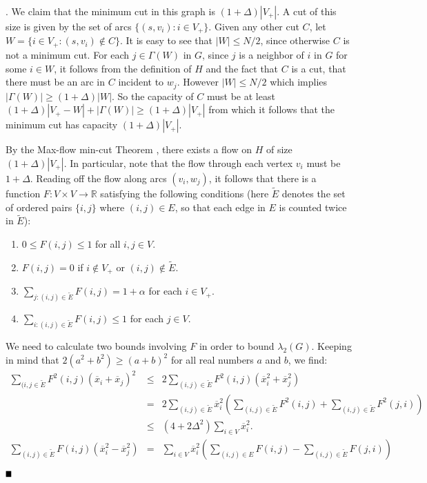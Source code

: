 \documentclass{article}
\newcommand{\bproof}{\noindent{\bf Proof}}
\newcommand{\eproof}{\hspace*{\fill}$\rule{2mm}{2mm}$~~~~\bigskip}
\renewenvironment{proof}{\bproof. }{\eproof}
\newcommand{\R}{\mathbb{R}}
\begin{document}
\begin{proof}
We claim that the minimum cut in this graph is $(1+\Delta )|V_+|$. A cut of this size is given by the set of arcs $\{ (s,v_i):i\in V_+\}$. Given any other cut $C$, let $W=\{ i\in V_+:(s,v_i)\not\in C\}$. It is easy to see that $|W|\leq N/2$, since otherwise $C$ is not a minimum cut. For each $j\in \Gamma (W)$ in $G$, since $j$ is a neighbor of $i$ in $G$ for some $i\in W$, it follows from the definition of $H$ and the fact that $C$ is a cut, that there must be an arc in $C$ incident to $w_j$. However $|W|\leq N/2$ which implies $|\Gamma (W)|\geq (1+\Delta )|W|$. So the capacity of $C$ must be at least $(1+\Delta )|V_+-W|+|\Gamma (W)|\geq (1+\Delta )|V_+|$ from which it follows that the minimum cut has capacity $(1+\Delta )|V_+|$.

By the Max-flow min-cut Theorem \cite[Section 24.2, Theorem 24.6]{CLR2022}, there exists a flow on $H$ of size $(1+\Delta )|V_+|$. In particular, note that the flow through each vertex $v_i$ must be $1+\Delta$. Reading off the flow along arcs $(v_i,w_j)$, it follows that there is a function $F:V\times V\rightarrow \R$ satisfying the following conditions (here $\tilde{E}$ denotes the set of ordered pairs $\{ i,j\}$ where $(i,j)\in E$, so that each edge in $E$ is counted twice in $\tilde{E}$):
\begin{enumerate}
\item $0\leq F(i,j)\leq 1$ for all $i,j\in V$.
\item $F(i,j)=0$ if $i\not\in V_+$ or $(i,j)\not\in \tilde{E}$.
\item $\sum_{j:(i,j)\in \tilde{E}}F(i,j)=1+\alpha$ for each $i\in V_+$.
\item $\sum_{i:(i,j)\in \tilde{E}}F(i,j)\leq 1$ for each $j\in V$.
\end{enumerate}
We need to calculate two bounds involving $F$ in order to bound $\lambda _2(G)$. Keeping in mind that $2(a^2+b^2)\geq (a+b)^2$ for all real numbers $a$ and $b$, we find:
\begin{eqnarray*}
\sum_{(i,j\in \tilde{E}}F^2(i,j)(\overline{x}_i+\overline{x}_j)^2 & \leq & 2\sum_{(i,j)\in \tilde{E}}F^2(i,j)(\overline{x}_i^2+\overline{x}_j^2)\\
 & = & 2\sum_{(i,j)\in \tilde{E}}\overline{x}_i^2\left (\sum_{(i,j)\in \tilde{E}}F^2(i,j)+\sum_{(i,j)\in \tilde{E}}F^2(j,i)\right )\\
 & \leq & (4+2\Delta ^2)\sum_{i\in V}\overline{x}_i^2.\\
\sum_{(i,j)\in\tilde{E}}F(i,j)(\overline{x}_i^2-\overline{x}_j^2) & = & \sum_{i\in V}\overline{x}_i^2\left (\sum_{(i,j)\in E}F(i,j)-\sum_{(i,j)\in \tilde{E}}F(j,i)\right )\\

\end{eqnarray*}
\end{proof}
\end{document}
